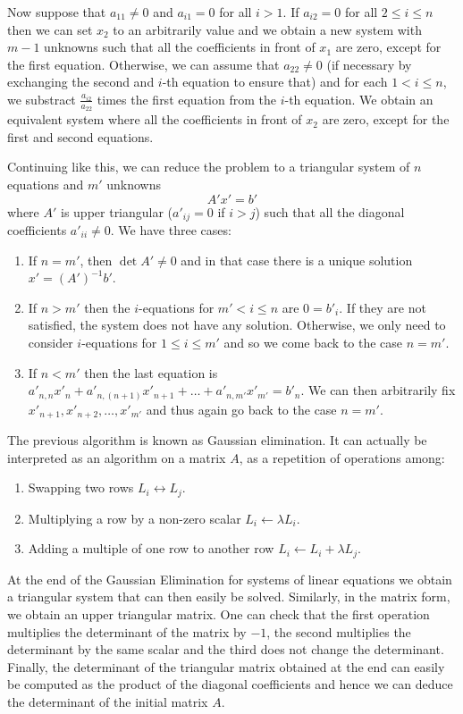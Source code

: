 Now suppose that $a_{11} \neq 0$ and $a_{i1} = 0$ for all $i > 1$. If
$a_{i2} = 0$ for all $2 \leq i \leq n$ then we can
set $x_2$ to an arbitrarily value and we obtain a new system with
$m-1$ unknowns such that all the coefficients in front of $x_1$ are zero,
except for the first equation.
Otherwise, we can assume that $a_{22} \neq 0$ (if necessary by exchanging
the second and $i$-th equation to ensure that) and for each $1 < i \leq n$, we
substract $\frac{a_{i2}}{a_{22}}$ times the first equation from the $i$-th
equation. We obtain an equivalent system where all the coefficients in front
of $x_2$ are zero, except for the first and second equations.

Continuing like this, we can reduce the problem to a triangular system of
$n$ equations and $m'$ unknowns
$$A'x' = b'$$
where $A'$ is upper triangular ($a'_{ij} = 0$ if $i > j$)
such that all the diagonal coefficients $a'_{ii} \neq 0$. We have three cases:
\begin{enumerate}
\item If $n = m'$, then $\det{A'} \neq 0$
  and in that case there is a unique solution $x' = {(A')}^{-1} b'$.
\item If $n > m'$ then the $i$-equations for $m' < i \leq n$ are
  $0 = b'_i$. If they are not satisfied, the system does not have any solution.
  Otherwise, we only need to consider $i$-equations for $1 \leq i \leq m'$ and
  so we come back to the case $n = m'$.
\item If $n < m'$ then the last equation is
  $a'_{n,n} x'_{n} + a'_{n,{(n+1)}} x'_{n+1} + \dots + a'_{n,m'} x'_{m'} = b'_{n}$.
  We can
  then arbitrarily fix $x'_{n+1}, x'_{n+2}, \dots, x'_{m'}$ and thus again
  go back to the case $n = m'$.
\end{enumerate}

The previous algorithm is known as Gaussian elimination. It can actually be
interpreted as an algorithm on a matrix $A$, as a repetition of operations
among:

\begin{enumerate}
\item Swapping two rows $L_i \leftrightarrow L_j$.
\item Multiplying a row by a non-zero scalar $L_i \leftarrow \lambda L_i$.
\item Adding a multiple of one row to another row
  $L_i \leftarrow L_i + \lambda L_j$.
\end{enumerate}

At the end of the Gaussian Elimination for systems of linear equations
we obtain a triangular system that can then easily be solved. Similarly, in the
matrix form, we obtain an upper triangular matrix. One can check that the first
operation multiplies the determinant of the matrix by $-1$, the second
multiplies the determinant by the same scalar and the third does not change the
determinant. Finally, the determinant of the triangular matrix obtained at the
end can easily be computed as the product of the diagonal coefficients and
hence we can deduce the determinant of the initial matrix $A$.

